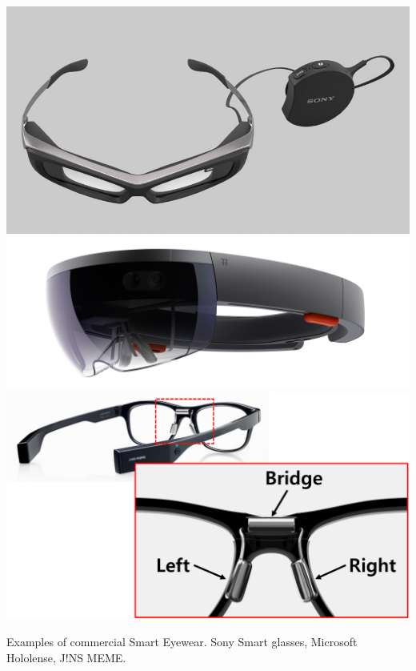 \documentclass{sigchi-ext}
\begin{document}
\begin{marginfigure}[0pc]
 \begin{minipage}{\marginparwidth}
   \centering  
      \includegraphics[width=\columnwidth]{figures/sony.jpg}
           \includegraphics[width=\columnwidth]{figures/holo.jpg}
   \includegraphics[width=\columnwidth]{figures/1-4}

  \caption{Examples of commercial Smart Eyewear. Sony Smart glasses, Microsoft Hololense, J!NS MEME.}~\label{fig:glasses}
 \end{minipage}
\end{marginfigure} 
\end{document}
